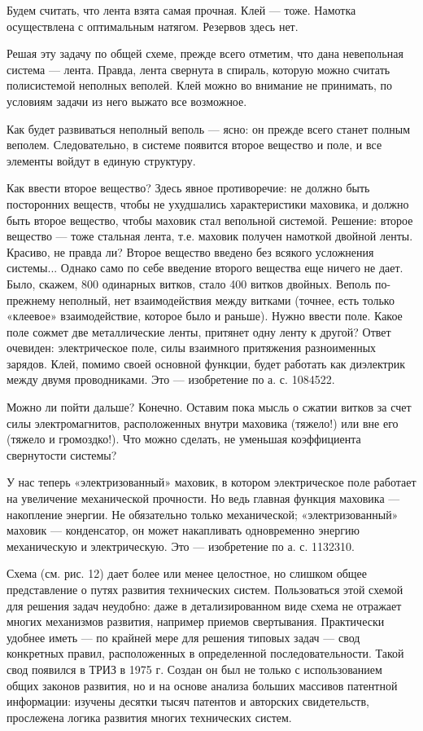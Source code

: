 Будем считать,  что лента  взята самая прочная.  Клей —  тоже. Намотка
осуществлена с оптимальным натягом. Резервов здесь нет.

Решая  эту задачу  по  общей  схеме, прежде  всего  отметим, что  дана
невепольная система — лента. Правда, лента свернута в спираль, которую
можно считать полисистемой неполных веполей. Клей можно во внимание не
принимать, по условиям задачи из него выжато все возможное.

Как будет развиваться  неполный веполь — ясно: он  прежде всего станет
полным веполем.  Следовательно, в  системе появится второе  вещество и
поле, и все элементы войдут в единую структуру.

Как ввести второе  вещество? Здесь явное противоречие:  не должно быть
посторонних веществ,  чтобы не  ухудшались характеристики  маховика, и
должно быть  второе вещество,  чтобы маховик стал  вепольной системой.
Решение: второе вещество  — тоже стальная лента,  т.е. маховик получен
намоткой двойной ленты. Красиво, не правда ли? Второе вещество введено
без всякого усложнения системы... Однако само по себе введение второго
вещества еще ничего не дает. Было, скажем, 800 одинарных витков, стало
400 витков  двойных. Веполь  по-прежнему неполный,  нет взаимодействия
между витками  (точнее, есть только «клеевое»  взаимодействие, которое
было и раньше). Нужно ввести поле. Какое поле сожмет две металлические
ленты,  притянет одну  ленту к  другой? Ответ  очевиден: электрическое
поле,  силы взаимного  притяжения разноименных  зарядов. Клей,  помимо
своей  основной функции,  будет  работать как  диэлектрик между  двумя
проводниками. Это — изобретение по а. с. 1084522.

Можно ли пойти дальше? Конечно. Оставим  пока мысль о сжатии витков за
счет силы электромагнитов, расположенных внутри маховика (тяжело!) или
вне  его  (тяжело  и  громоздко!).  Что  можно  сделать,  не  уменьшая
коэффициента свернутости системы?

У нас  теперь «электризованный» маховик, в  котором электрическое поле
работает на увеличение механической прочности. Но ведь главная функция
маховика  — накопление  энергии. Не  обязательно только  механической;
«электризованный»   маховик  —   конденсатор,  он   может  накапливать
одновременно энергию  механическую и электрическую. Это  — изобретение
по а. с. 1132310.


Схема  (см.  рис. 12)  дает  более  или  менее целостное,  но  слишком
общее представление о путях  развития технических систем. Пользоваться
этой  схемой  для  решения  задач неудобно:  даже  в  детализированном
виде схема  не отражает  многих механизмов развития,  например приемов
свертывания. Практически удобнее  иметь — по крайней  мере для решения
типовых задач  — свод конкретных правил,  расположенных в определенной
последовательности. Такой свод появился в ТРИЗ в 1975 г. Создан он был
не  только с  использованием общих  законов развития,  но и  на основе
анализа больших  массивов патентной информации: изучены  десятки тысяч
патентов и  авторских свидетельств, прослежена логика  развития многих
технических систем.

